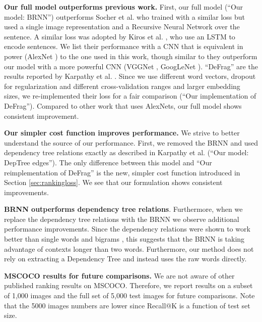 \documentclass[10pt,twocolumn,letterpaper]{article}
\begin{document}
\textbf{Our full model outperforms previous work.} First, our full model (``Our model: BRNN'') outperforms Socher et al. \cite{sochergrounded} who trained with a similar loss but used a single image representation and a Recursive Neural Network over the sentence. A similar loss was adopted by Kiros et al. \cite{kiros2014unifying}, who use an LSTM \cite{hochreiter1997long} to encode sentences. We list their performance with a CNN that is equivalent in power (AlexNet \cite{krizhevsky2012imagenet}) to the one used in this work, though similar to \cite{vinyals2014show} they outperform our model with a more powerful CNN (VGGNet \cite{simonyan2014very}, GoogLeNet \cite{szegedy2014going}). ``DeFrag'' are the results reported by Karpathy et al. \cite{defrag}. Since we use different word vectors, dropout for regularization and different cross-validation ranges and larger embedding sizes, we re-implemented their loss for a fair comparison (``Our implementation of DeFrag''). Compared to other work that uses AlexNets, our full model shows consistent improvement.

\vspace{-0.05in}
\textbf{Our simpler cost function improves performance.} We strive to better understand the source of our performance. First, we removed the BRNN and used dependency tree relations exactly as described in Karpathy et al. \cite{defrag} (``Our model: DepTree edges''). The only difference between this model and ``Our reimplementation of DeFrag'' is the new, simpler cost function introduced in Section \ref{sec:rankingloss}. We see that our formulation shows consistent improvements.

\vspace{-0.05in}
\textbf{BRNN outperforms dependency tree relations}. Furthermore, when we replace the dependency tree relations with the BRNN we observe additional performance improvements. Since the dependency relations were shown to work better than single words and bigrams \cite{defrag}, this suggests that the BRNN is taking advantage of contexts longer than two words. Furthermore, our method does not rely on extracting a Dependency Tree and instead uses the raw words directly.

\vspace{-0.05in}
\textbf{MSCOCO results for future comparisons.} We are not aware of other published ranking results on MSCOCO. Therefore, we report results on a subset of 1,000 images and the full set of 5,000 test images for future comparisons. Note that the 5000 images numbers are lower since Recall@K is a function of test set size.
\end{document}

